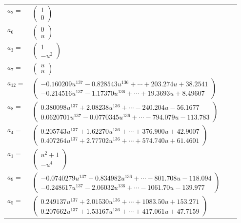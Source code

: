 \documentclass[1p]{elsarticle_modified}
\theoremstyle{definition}
\begin{document}
\begin{tabular}{m{7pt} m{180pt} m{7pt} m{180pt} }
\flushright $a_{2}=$&$\begin{pmatrix}1\\0\end{pmatrix}$ \\
\flushright $a_{6}=$&$\begin{pmatrix}0\\u\end{pmatrix}$ \\
\flushright $a_{3}=$&$\begin{pmatrix}1\\- u^2\end{pmatrix}$ \\
\flushright $a_{7}=$&$\begin{pmatrix}u\\u\end{pmatrix}$ \\
\flushright $a_{12}=$&$\begin{pmatrix}-0.160209 u^{137}-0.828543 u^{136}+\cdots+203.274 u+38.2541\\-0.214516 u^{137}-1.17370 u^{136}+\cdots+19.3693 u+8.49607\end{pmatrix}$ \\
\flushright $a_{8}=$&$\begin{pmatrix}0.380098 u^{137}+2.08238 u^{136}+\cdots-240.204 u-56.1677\\0.0620701 u^{137}-0.0770345 u^{136}+\cdots-794.079 u-113.783\end{pmatrix}$ \\
\flushright $a_{4}=$&$\begin{pmatrix}0.205743 u^{137}+1.62270 u^{136}+\cdots+376.900 u+42.9007\\0.407264 u^{137}+2.77702 u^{136}+\cdots+574.740 u+61.4601\end{pmatrix}$ \\
\flushright $a_{1}=$&$\begin{pmatrix}u^2+1\\- u^4\end{pmatrix}$ \\
\flushright $a_{9}=$&$\begin{pmatrix}-0.0740279 u^{137}-0.834982 u^{136}+\cdots-801.708 u-118.094\\-0.248617 u^{137}-2.06032 u^{136}+\cdots-1061.70 u-139.977\end{pmatrix}$ \\
\flushright $a_{5}=$&$\begin{pmatrix}0.249137 u^{137}+2.01530 u^{136}+\cdots+1083.50 u+153.271\\0.207662 u^{137}+1.53167 u^{136}+\cdots+417.061 u+47.7159\end{pmatrix}$ \\

\end{tabular}
\end{document}

